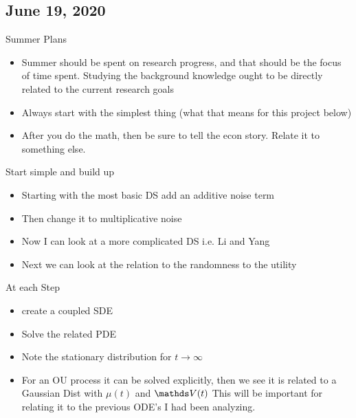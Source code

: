 \subsection{June 19, 2020}
Summer Plans
\begin{itemize}
	\item Summer should be spent on research progress, and that should be the focus of time spent. Studying the background knowledge ought to be directly related to the current research goals
	\item Always start with the simplest thing (what that means for this project below)
	\item After you do the math, then be sure to tell the econ story. Relate it to something else.
\end{itemize}\enter
Start simple and build up
\begin{itemize}
	\item Starting with the most basic DS add an additive noise term
	\item Then change it to multiplicative noise
	\item Now I can look at a more complicated DS i.e. Li and Yang
	\item Next we can look at the relation to the randomness to the utility
\end{itemize}\enter
At each Step 
\begin{itemize}
	\item create a coupled SDE
	\item Solve the related PDE
	\item Note the stationary distribution for $t\rightarrow\infty$
	\item For an OU process it can be solved explicitly, then we see it is related to a Gaussian Dist with $\mu(t)$ and $\Vb(t)$
	This will be important for relating it to the previous ODE's I had been analyzing.
\end{itemize}





















